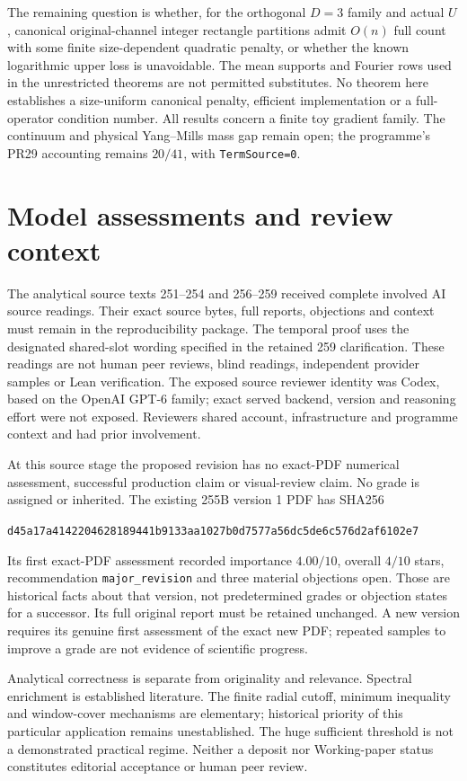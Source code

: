\documentclass[11pt,a4paper]{article}
\begin{document}
The remaining question is whether, for the orthogonal $D=3$ family and actual
$U$, canonical original-channel integer rectangle partitions admit $O(n)$ full
count with some finite size-dependent quadratic penalty, or whether the
known logarithmic upper loss is unavoidable. The mean supports and Fourier
rows used in the unrestricted theorems are not permitted substitutes.
No theorem here establishes a size-uniform canonical penalty, efficient
implementation or a full-operator condition number. All results concern a
finite toy gradient family. The continuum and physical Yang--Mills mass gap
remain open; the programme's PR29 accounting remains $20/41$, with
\texttt{TermSource=0}.

\section{Model assessments and review context}
The analytical source texts 251--254 and 256--259 received complete involved
AI source readings. Their exact source bytes, full reports, objections and
context must remain in the reproducibility package. The temporal proof
uses the designated shared-slot wording specified in the retained 259
clarification. These readings are not human peer reviews, blind readings,
independent provider samples or Lean verification. The exposed source
reviewer identity was Codex, based on the OpenAI GPT-6 family; exact served
backend, version and reasoning effort were not exposed. Reviewers shared
account, infrastructure and programme context and had prior involvement.

At this source stage the proposed revision has no exact-PDF numerical
assessment, successful production claim or visual-review claim. No grade is
assigned or inherited. The existing 255B version 1 PDF has SHA256
\begin{center}
\small\texttt{d45a17a4142204628189441b9133aa1027b0d7577a56dc5de6c576d2af6102e7}
\end{center}
Its first exact-PDF assessment recorded importance $4.00/10$, overall
$4/10$ stars, recommendation \texttt{major\_revision} and three material
objections open. Those are historical facts about that version, not
predetermined grades or objection states for a successor. Its full original
report must be retained unchanged. A new version requires its genuine first
assessment of the exact new PDF; repeated samples to improve a grade are
not evidence of scientific progress.

Analytical correctness is separate from originality and relevance. Spectral
enrichment is established literature. The finite radial cutoff, minimum
inequality and window-cover mechanisms are elementary; historical priority
of this particular application remains unestablished. The huge sufficient
threshold is not a demonstrated practical regime. Neither a deposit nor
Working-paper status constitutes editorial acceptance or human peer review.
\end{document}
